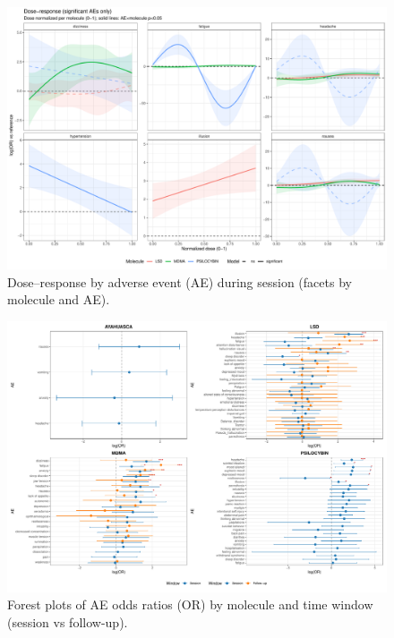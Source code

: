 \begin{figure}[htb]
  \centering
  \includegraphics[width=\textwidth]{figures/master_dr_by_ae-session.pdf}
  \caption{Dose--response by adverse event (AE) during session (facets by molecule and AE).}
  \label{fig:dr-by-ae-session}
\end{figure}

\begin{figure}[htb]
  \centering
  \includegraphics[width=\textwidth]{figures/forest_combined_all_molecules.pdf}
  \caption{Forest plots of AE odds ratios (OR) by molecule and time window (session vs follow-up).}
  \label{fig:forest-combined}
\end{figure}





